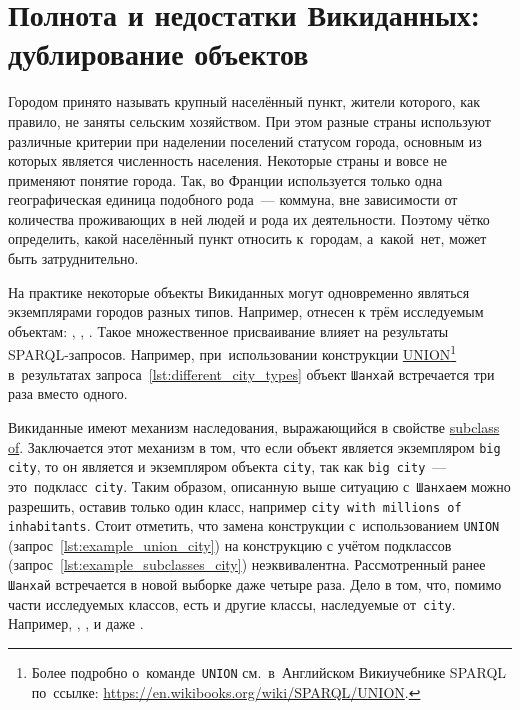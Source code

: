 \section{Полнота и недостатки Викиданных: дублирование объектов}
\label{sect:city-completness}

Городом принято называть крупный населённый пункт, 
жители которого, как правило, не заняты сельским хозяйством. 
При этом разные страны используют различные критерии 
при наделении поселений статусом города, 
основным из которых является численность населения. 
Некоторые страны и вовсе не применяют понятие города. 
Так, во Франции используется только одна географическая единица подобного рода~--- коммуна, 
вне зависимости от количества проживающих в ней людей и рода их деятельности. 
Поэтому чётко определить, какой населённый пункт относить к~городам, а~какой~нет, может быть затруднительно.

На практике некоторые объекты Викиданных могут одновременно являться экземплярами городов разных типов. 
Например,  отнесен к трём исследуемым объектам: 
, , . 
Такое множественное присваивание влияет на результаты SPARQL-запросов. 
Например, 
при~использовании конструкции \href{https://en.wikibooks.org/wiki/SPARQL/UNION}{UNION}\footnote[][-15pt]{%
%
    Более подробно о~команде~\texttt{UNION} 
    см.~в~Английском Викиучебнике SPARQL по~ссылке: \href{https://en.wikibooks.org/wiki/SPARQL/UNION}{https://en.wikibooks.org/wiki/SPARQL/UNION}.%
} %
в~результатах запроса~\ref{lst:different_city_types} 
объект \lstinline|Шанхай| встречается три раза вместо одного. 

Викиданные имеют механизм наследования, 
выражающийся в свойстве \href{https://www.wikidata.org/wiki/Property:P279}{subclass of}. 
Заключается этот механизм в том, что если объект является экземпляром \lstinline{big city}, 
то он является и экземпляром объекта \lstinline{city}, 
так как \lstinline|big city|~--- это~подкласс~\lstinline|city|. 
Таким образом, описанную выше ситуацию с~\lstinline|Шанхаем| можно разрешить, 
оставив только один класс, например \mbox{\lstinline{city with millions of inhabitants}}. 
Стоит отметить, что замена конструкции 
с~использованием \lstinline|UNION| (запрос~\ref{lst:example_union_city}) 
на конструкцию с учётом подклассов (запрос~\ref{lst:example_subclasses_city})
неэквивалентна. 
Рассмотренный ранее \lstinline|Шанхай| встречается в новой выборке даже четыре раза. 
Дело в том, что, помимо части исследуемых классов, есть и другие классы, наследуемые от~\lstinline|city|. 
Например, , 
, 
 и даже .

